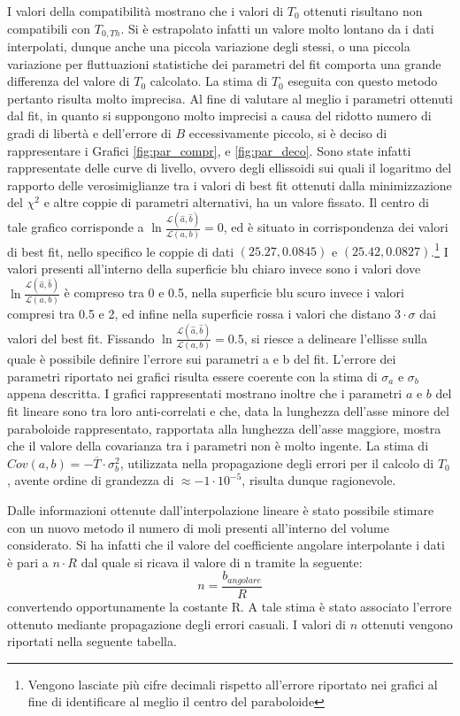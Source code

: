\documentclass[a4paper,11pt,oneside]{article}
\begin{document}
I valori della compatibilità mostrano che i valori di $T_0$ ottenuti risultano non compatibili con $T_{0, Th}$.
Si è estrapolato infatti un valore molto lontano da i dati interpolati, dunque anche una piccola variazione degli stessi, o una piccola variazione per fluttuazioni statistiche dei parametri del fit comporta una grande differenza del valore di $T_0$ calcolato. La stima di $T_0$ eseguita con questo metodo pertanto risulta molto imprecisa.
Al fine di valutare al meglio i parametri ottenuti dal fit, in quanto si suppongono molto imprecisi a causa del ridotto numero di gradi di libertà e dell'errore di $B$ eccessivamente piccolo, si è deciso di rappresentare i Grafici \ref{fig:par_compr}, e \ref{fig:par_deco}. 
Sono state infatti rappresentate delle curve di livello, ovvero degli ellissoidi sui quali il logaritmo del rapporto delle verosimiglianze tra i valori di best fit ottenuti dalla minimizzazione del $\chi^2$ e altre coppie di parametri alternativi, ha un valore fissato. Il centro di tale grafico corrisponde a $\ln\frac{\mathcal{L}(\hat a,\hat b)}{\mathcal{L}(a,b)}=0$, ed è situato in corrispondenza dei valori di best fit, nello specifico le coppie di dati $(25.27,0.0845)$ e $(25.42, 0.0827)$.\footnote{Vengono lasciate più cifre decimali rispetto all'errore riportato nei grafici al fine di identificare al meglio il centro del paraboloide}
I valori presenti all'interno della superficie blu chiaro invece sono i valori dove $\ln\frac{\mathcal{L}(\hat a,\hat b)}{\mathcal{L}(a,b)}$ è compreso tra 0 e 0.5, nella superficie blu scuro invece i valori compresi tra 0.5 e 2, ed infine nella superficie rossa i valori che distano $3\cdot\sigma$ dai valori del best fit. Fissando $\ln\frac{\mathcal{L}(\hat a,\hat b)}{\mathcal{L}(a,b)}= 0.5$, si riesce a delineare l'ellisse sulla quale è possibile definire l'errore sui parametri a e b del fit. L'errore dei parametri riportato nei grafici risulta essere coerente con la stima di $\sigma_a$ e $\sigma_b$ appena descritta. I grafici rappresentati mostrano inoltre che i parametri $a$ e $b$ del fit lineare sono  tra loro anti-correlati e che, data la lunghezza dell'asse minore del paraboloide rappresentato, rapportata alla lunghezza dell'asse maggiore, mostra che il valore della covarianza tra i parametri non è molto ingente. 
La stima di $Cov(a,b)= -\overline{T}\cdot \sigma_b^2$, utilizzata nella propagazione degli errori per il calcolo di $T_0$, avente ordine di grandezza di $\approx -1\cdot10^{-5}$, risulta dunque ragionevole.

Dalle informazioni ottenute dall'interpolazione lineare è stato possibile stimare con un nuovo metodo il numero di moli presenti all'interno del volume considerato. Si ha infatti che il valore del coefficiente angolare interpolante i dati è pari a $n \cdot R$ dal quale si ricava il valore di n tramite la seguente: 
\begin{equation*}
    n= \frac{b_{angolare}}{R}
\end{equation*}
convertendo opportunamente la costante R. A tale stima è stato associato l'errore ottenuto mediante propagazione degli errori casuali. I valori di $n$ ottenuti vengono riportati nella seguente tabella. 
\end{document}
